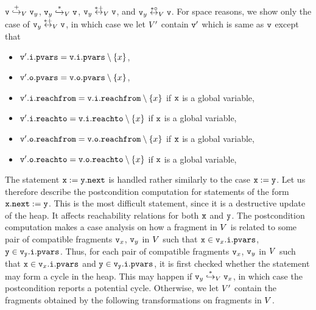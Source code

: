 \begin{enumerate}
  $\mathtt{v} \overset{+}\hookrightarrow_{V} \mathtt{v}_y$,
  $\mathtt{v}_y \overset{*}\hookrightarrow_{V} \mathtt{v}$,
  $\mathtt{v}_y \overset{*+}\leftrightarrow_{V} \mathtt{v}$, and
  $\mathtt{v}_y \overset{*\circ}\leftrightarrow_{V} \mathtt{v}$. For space reasons,
  we show only the case of $\mathtt{v}_y \overset{*+}\leftrightarrow_{V} \mathtt{v}$,
  in which case we let $V'$ contain $\mathtt{v}'$ which is same as $\mathtt{v}$ except that
\begin{itemize}
\item $\mathtt{v}'.\mathtt{i}.\mathtt{pvars} = \mathtt{v}.\mathtt{i}.\mathtt{pvars} \setminus \left\{x\right\}$,
\item $\mathtt{v}'.\mathtt{o}.\mathtt{pvars} = \mathtt{v}.\mathtt{o}.\mathtt{pvars} \setminus \left\{x\right\}$,
\item $\mathtt{v}'.\mathtt{i}.\mathtt{reachfrom} = \mathtt{v}.\mathtt{i}.\mathtt{reachfrom} \setminus \left\{x\right\}$ if $\tt x$ is a global variable,
\item $\mathtt{v}'.\mathtt{i}.\mathtt{reachto} = \mathtt{v}.\mathtt{i}.\mathtt{reachto} \setminus \left\{x\right\}$ if $\tt x$ is a global variable,
\item $\mathtt{v}'.\mathtt{o}.\mathtt{reachfrom} = \mathtt{v}.\mathtt{o}.\mathtt{reachfrom} \setminus \left\{x\right\}$ if $\tt x$ is a global variable,
\item $\mathtt{v}'.\mathtt{o}.\mathtt{reachto} = \mathtt{v}.\mathtt{o}.\mathtt{reachto} \setminus \left\{x\right\}$ if $\tt x$ is a global variable,
\end{itemize}
\end{enumerate}
The statement ${\tt x := y.next}$ is handled rather similarly to the 
case ${\tt x := y}$.
Let us therefore describe the postcondition computation for statements of the form
${\tt x.next:= y}$.
This is the most difficult statement, since it is a destructive update of the heap. It affects reachability relations for both $\mathtt{x}$ and $\mathtt{y}$.
The postcondition computation makes a case analysis on how a fragment
in $V$ is related to some pair of compatible fragments $\mathtt{v}_x$, $\mathtt{v}_y$ in $V$ such that $\mathtt{x} \in \mathtt{v}_x.\mathtt{i}.\mathtt{pvars}$, $\tt y \in \mathtt{v}_y.\mathtt{i}.\mathtt{pvars}$. 
Thus, for each pair of compatible fragments $\mathtt{v}_x$, $\mathtt{v}_y$ in $V$ such that $\mathtt{x} \in \mathtt{v}_x.\mathtt{i}.\mathtt{pvars}$ and $\tt y \in \mathtt{v}_y.\mathtt{i}.\mathtt{pvars}$, it is first checked whether the statement may form
a cycle in the heap. This may happen if
$\mathtt{v}_y \overset{*}\hookrightarrow_{V}\mathtt{v}_x$, in which case the postcondition reports a potential cycle.
Otherwise, we let $V'$ contain
the fragments obtained by the following transformations on fragments in
$V$.
